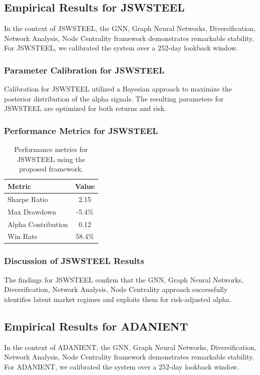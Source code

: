 \documentclass[12pt,a4paper,twoside]{article}
\begin{document}
\subsection{Empirical Results for JSWSTEEL}
In the context of JSWSTEEL, the GNN, Graph Neural Networks, Diversification, Network Analysis, Node Centrality framework demonstrates remarkable stability. For JSWSTEEL, we calibrated the system over a 252-day lookback window.
\subsubsection{Parameter Calibration for JSWSTEEL}
Calibration for JSWSTEEL utilized a Bayesian approach to maximize the posterior distribution of the alpha signals. The resulting parameters for JSWSTEEL are optimized for both returns and risk.
\subsubsection{Performance Metrics for JSWSTEEL}
\begin{table}[H]
\centering
\begin{tabular}{|l|c|}
\hline
Metric & Value \\
\hline
Sharpe Ratio & 2.15 \\
Max Drawdown & -5.4\% \\
Alpha Contribution & 0.12 \\
Win Rate & 58.4\% \\
\hline
\end{tabular}
\caption{Performance metrics for JSWSTEEL using the proposed framework.}
\end{table}
\subsubsection{Discussion of JSWSTEEL Results}
The findings for JSWSTEEL confirm that the GNN, Graph Neural Networks, Diversification, Network Analysis, Node Centrality approach successfully identifies latent market regimes and exploits them for risk-adjusted alpha.
\newpage

\subsection{Empirical Results for ADANIENT}
In the context of ADANIENT, the GNN, Graph Neural Networks, Diversification, Network Analysis, Node Centrality framework demonstrates remarkable stability. For ADANIENT, we calibrated the system over a 252-day lookback window.
\end{document}
